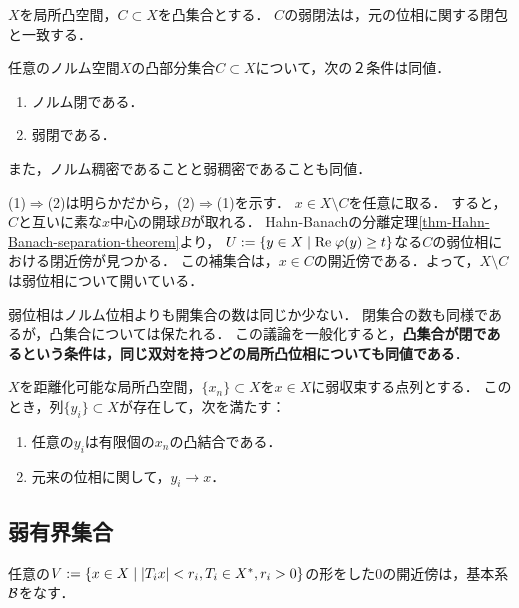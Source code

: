 \documentclass[uplatex,dvipdfmx]{jsreport}
\begin{document}
\begin{theorem}
    $X$を局所凸空間，$C\subset X$を凸集合とする．
    $C$の弱閉法は，元の位相に関する閉包と一致する．
\end{theorem}

\begin{proposition}\label{prop-closedness-of-convex-sets}
    任意のノルム空間$X$の凸部分集合$C\subset X$について，次の２条件は同値．
    \begin{enumerate}
        \item ノルム閉である．
        \item 弱閉である．
    \end{enumerate}
    また，ノルム稠密であることと弱稠密であることも同値．
\end{proposition}
\begin{Proof}
    (1)$\Rightarrow$(2)は明らかだから，(2)$\Rightarrow$(1)を示す．
    $x\in X\setminus C$を任意に取る．
    すると，$C$と互いに素な$x$中心の開球$B$が取れる．
    Hahn-Banachの分離定理\ref{thm-Hahn-Banach-separation-theorem}より，
    $U:=\left\{y\in X\mid\mathrm{Re}\;\varphi(y)\ge t\right\}$なる$C$の弱位相における閉近傍が見つかる．
    この補集合は，$x\in C$の開近傍である．よって，$X\setminus C$は弱位相について開いている．
\end{Proof}
\begin{remarks}[同じ双対空間を持つということの帰結]
    弱位相はノルム位相よりも開集合の数は同じか少ない．
    閉集合の数も同様であるが，凸集合については保たれる．
    この議論を一般化すると，\textbf{凸集合が閉であるという条件は，同じ双対を持つどの局所凸位相についても同値である}．
\end{remarks}

\begin{corollary}
    $X$を距離化可能な局所凸空間，$\{x_n\}\subset X$を$x\in X$に弱収束する点列とする．
    このとき，列$\{y_i\}\subset X$が存在して，次を満たす：
    \begin{enumerate}
        \item 任意の$y_i$は有限個の$x_n$の凸結合である．
        \item 元来の位相に関して，$y_i\to x$．
    \end{enumerate}
\end{corollary}

\subsection{弱有界集合}

\begin{tcolorbox}[colframe=ForestGreen, colback=ForestGreen!10!white,breakable,colbacktitle=ForestGreen!40!white,coltitle=black,fonttitle=\bfseries\sffamily,
title=]
任意の$V:=\left\{x\in X\mid\lvert T_ix\rvert<r_i,T_i\in X^*,r_i>0\right\}$の形をした$0$の開近傍は，基本系$\mathcal{B}$をなす．
\end{tcolorbox}
\end{document}
